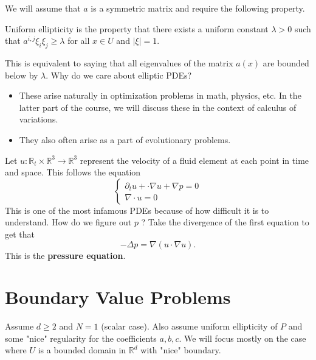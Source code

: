 We will assume that $a$ is a symmetric matrix and require the following property.

\begin{definition}
\label{def: Uniform ellipticity}
Uniform ellipticity is the property that there exists a uniform constant $\lambda>0$ such that $a^{i, j} \xi_{i} \xi_{j} \geq \lambda$ for all $x \in U$ and $|\xi|=1$.
\end{definition}

This is equivalent to saying that all eigenvalues of the matrix $a(x)$ are bounded below by $\lambda$.
Why do we care about elliptic PDEs?

\begin{itemize}
    \item These arise naturally in optimization problems in math, physics, etc. In the latter part of the course, we will discuss these in the context of calculus of variations.
    \item They also often arise as a part of evolutionary problems.
\end{itemize}

\begin{example}
\label{eg: Incompressible Euler equations}
Let $u: \mathbb{R}_{t} \times \mathbb{R}^{3} \rightarrow \mathbb{R}^{3}$ represent the velocity of a fluid element at each point in time and space. This follows the equation
$$
\left\{\begin{array}{l}
\partial_{t}u + \cdot \nabla u+\nabla p=0 \\
\nabla \cdot u=0
\end{array}\right.
$$
This is one of the most infamous PDEs because of how difficult it is to understand. How do we figure out $p$ ? Take the divergence of the first equation to get that
$$
-\Delta p=\nabla(u \cdot \nabla u) .
$$
This is the \textbf{pressure equation}.
\end{example}

\newpage 
\section{Boundary Value Problems}
Assume $d \geq 2$ and $N=1$ (scalar case). Also assume uniform ellipticity of $P$ and some "nice" regularity for the coefficients $a, b, c$. We will focus mostly on the case where $U$ is a bounded domain in $\mathbb{R}^{d}$ with "nice" boundary.


